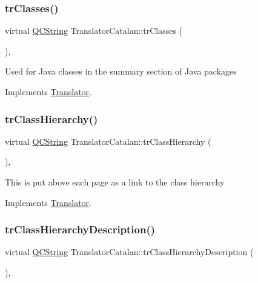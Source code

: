 \mbox{\label{class_translator_catalan_aa982e3fd81876c69cf13f3fb69f56ad5}} 
\subsubsection{\texorpdfstring{trClasses()}{trClasses()}}
{\footnotesize\ttfamily virtual \mbox{\hyperlink{class_q_c_string}{Q\+C\+String}} Translator\+Catalan\+::tr\+Classes (\begin{DoxyParamCaption}{ }\end{DoxyParamCaption})\hspace{0.3cm}{\ttfamily [inline]}, {\ttfamily [virtual]}}

Used for Java classes in the summary section of Java packages 

Implements \mbox{\hyperlink{class_translator}{Translator}}.

\mbox{\label{class_translator_catalan_aca017176d6cba8de86324b27ad25b771}} 
\subsubsection{\texorpdfstring{trClassHierarchy()}{trClassHierarchy()}}
{\footnotesize\ttfamily virtual \mbox{\hyperlink{class_q_c_string}{Q\+C\+String}} Translator\+Catalan\+::tr\+Class\+Hierarchy (\begin{DoxyParamCaption}{ }\end{DoxyParamCaption})\hspace{0.3cm}{\ttfamily [inline]}, {\ttfamily [virtual]}}

This is put above each page as a link to the class hierarchy 

Implements \mbox{\hyperlink{class_translator}{Translator}}.

\mbox{\label{class_translator_catalan_ab5f2de1678ede9737b050adc8a328c61}} 
\subsubsection{\texorpdfstring{trClassHierarchyDescription()}{trClassHierarchyDescription()}}
{\footnotesize\ttfamily virtual \mbox{\hyperlink{class_q_c_string}{Q\+C\+String}} Translator\+Catalan\+::tr\+Class\+Hierarchy\+Description (\begin{DoxyParamCaption}{ }\end{DoxyParamCaption})\hspace{0.3cm}{\ttfamily [inline]}, {\ttfamily [virtual]}}

